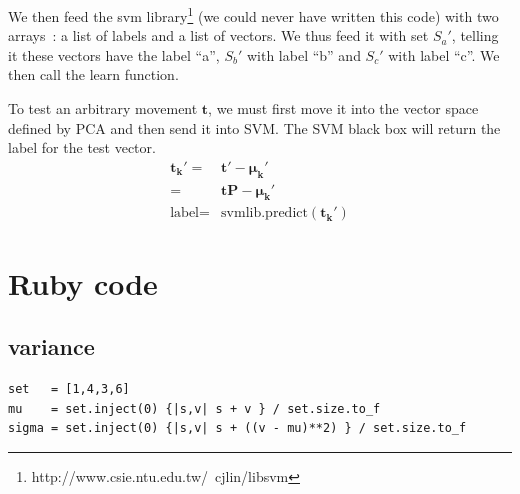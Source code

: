 \documentclass[11pt,twocolumn]{amsart} %
\newcommand{\ve}[1]{\boldsymbol{#1}}
\newcommand{\ma}[1]{\boldsymbol{#1}}
\begin{document}
We then feed the svm library\footnote{http://www.csie.ntu.edu.tw/~cjlin/libsvm} (we could never have written this code) with two arrays~: a list of labels and a list of vectors. We thus feed it with set $S_{a}'$, telling it these vectors have the label ``a'', $S_{b}'$ with label ``b'' and $S_{c}'$ with label ``c''. We then call the learn function.

To test an arbitrary movement $\ve{t}$, we must first move it into the vector space defined by PCA and then send it into SVM. The SVM black box will return the label for the test vector.
\begin{align*}
  \ve{t_k'} = & \ve{t'} - \ve{\mu_k'} \\
            = & \ve{t}\ma{P} - \ve{\mu_k'} \\
  \text{label} = & \text{svmlib.predict}(\ve{t_k'})
\end{align*}

\onecolumn

\section{Ruby code}
\subsection{variance}
\begin{verbatim}
set   = [1,4,3,6]
mu    = set.inject(0) {|s,v| s + v } / set.size.to_f
sigma = set.inject(0) {|s,v| s + ((v - mu)**2) } / set.size.to_f
\end{verbatim}
\end{document}
